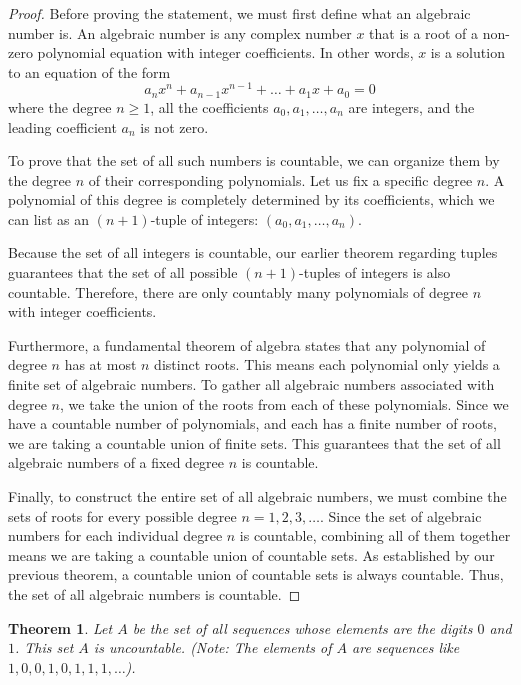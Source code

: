 \documentclass{article}
\theoremstyle{mythm}
\newtheorem{theorem}{Theorem}[section]
\begin{document}
\begin{proof}
Before proving the statement, we must first define what an algebraic number is. An algebraic number is any complex number $x$ that is a root of a non-zero polynomial equation with integer coefficients. In other words, $x$ is a solution to an equation of the form 
\[ a_n x^n + a_{n-1} x^{n-1} + \dots + a_1 x + a_0 = 0 \]
where the degree $n \ge 1$, all the coefficients $a_0, a_1, \dots, a_n$ are integers, and the leading coefficient $a_n$ is not zero.

To prove that the set of all such numbers is countable, we can organize them by the degree $n$ of their corresponding polynomials. Let us fix a specific degree $n$. A polynomial of this degree is completely determined by its coefficients, which we can list as an $(n+1)$-tuple of integers: $(a_0, a_1, \dots, a_n)$. 

Because the set of all integers is countable, our earlier theorem regarding tuples guarantees that the set of all possible $(n+1)$-tuples of integers is also countable. Therefore, there are only countably many polynomials of degree $n$ with integer coefficients.

Furthermore, a fundamental theorem of algebra states that any polynomial of degree $n$ has at most $n$ distinct roots. This means each polynomial only yields a finite set of algebraic numbers. To gather all algebraic numbers associated with degree $n$, we take the union of the roots from each of these polynomials. Since we have a countable number of polynomials, and each has a finite number of roots, we are taking a countable union of finite sets. This guarantees that the set of all algebraic numbers of a fixed degree $n$ is countable.

Finally, to construct the entire set of all algebraic numbers, we must combine the sets of roots for every possible degree $n = 1, 2, 3, \dots$. Since the set of algebraic numbers for each individual degree $n$ is countable, combining all of them together means we are taking a countable union of countable sets. As established by our previous theorem, a countable union of countable sets is always countable. Thus, the set of all algebraic numbers is countable.
\end{proof}
\begin{theorem}
Let $A$ be the set of all sequences whose elements are the digits $0$ and $1$. This set $A$ is uncountable. 
(Note: The elements of $A$ are sequences like $1, 0, 0, 1, 0, 1, 1, 1, \dots$).
\end{theorem}
\end{document}
